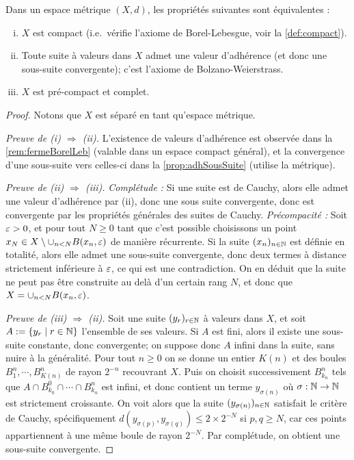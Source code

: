 \begin{theorem}
\label{th:BolzanoWeierstrass}
%
Dans un espace métrique $(X,d)$, les propriétés suivantes sont équivalentes : 
\begin{enumerate}[(i)]
	\item $X$ est compact (i.e.\ vérifie l'axiome de Borel-Lebesgue, voir la \cref{def:compact}).
	\item Toute suite à valeurs dans $X$ admet une valeur d'adhérence (et donc une sous-suite convergente); c'est l'axiome de Bolzano-Weierstrass.
	\item $X$ est pré-compact et complet.
\end{enumerate}
\end{theorem}

\begin{proof}
	Notons que $X$ est séparé en tant qu'espace métrique. 
	
	\emph{Preuve de (i) $\Rightarrow$ (ii).} L'existence de valeurs d'adhérence est observée dans la \cref{rem:fermeBorelLeb} (valable dans un espace compact général), et la convergence d'une sous-suite vers celles-ci dans la \cref{prop:adhSousSuite} (utilise la métrique). 

	\emph{Preuve de (ii) $\Rightarrow$ (iii).} \emph{Complétude :} Si une suite est de Cauchy, alors elle admet une valeur d'adhérence par (ii), donc une sous suite convergente, donc est convergente par les propriétés générales des suites de Cauchy. 
	\emph{Précompacité :}
	Soit $\varepsilon>0$, et pour tout $N \geq 0$ tant que c'est possible choisissons un point  
	$x_N \in X \setminus \cup_{n<N} B(x_n,\varepsilon)$ de manière récurrente. Si la suite $(x_n)_{n\in \mathbb{N}}$ est définie en totalité, alors elle admet une sous-suite convergente, donc deux termes à distance strictement inférieure à $\varepsilon$, ce qui est une contradiction. On en déduit que la suite ne peut pas être construite au delà d'un certain rang $N$, et donc que $X = \cup_{n<N} B(x_n,\varepsilon)$. 
	
	\emph{Preuve de (iii) $\Rightarrow$ (ii).}
	Soit une suite $(y_r)_{r \in \mathbb{N}}$ à valeurs dans $X$, et soit $A := \{y_r \mid r \in \mathbb{N}\}$ l'ensemble de ses valeurs. Si $A$ est fini, alors il existe une sous-suite constante, donc convergente; on suppose donc $A$ infini dans la suite, sans nuire à la généralité.
	Pour tout $n\geq 0$ on se donne un entier $K(n)$ et des boules $B_1^n, \cdots, B_{K(n)}^n$ de rayon $2^{-n}$ recouvrant $X$. 
	Puis on choisit successivement $B_{k_n}^n$ tels que $A \cap B_{k_0}^0 \cap \cdots \cap B_{k_n}^n$ est infini, et donc contient un terme $y_{\sigma(n)}$ où $\sigma : \mathbb{N} \to \mathbb{N}$ est strictement croissante.
	On voit alors que la suite $(y_{\sigma(n)})_{n \in \mathbb{N}}$ satisfait le critère de Cauchy, spécifiquement $d(y_{\sigma(p)},y_{\sigma(q)}) \leq 2 \times 2^{-N}$ si $p,q \geq N$, car ces points appartiennent à une même boule de rayon $2^{-N}$. Par complétude, on obtient une sous-suite convergente. 
	

\end{proof}

